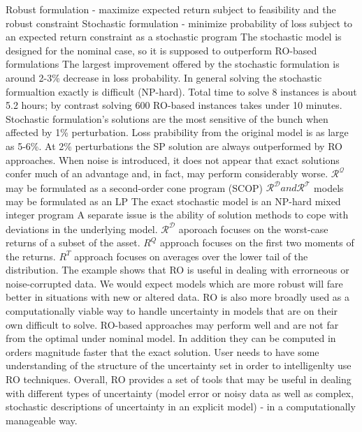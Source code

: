 \documentclass{beamer}
\begin{document}
\begin{frame}{}
Robust formulation - maximize expected return subject to feasibility and the robust constraint
Stochastic formulation - minimize probability of loss subject to an expected return constraint as a stochastic program
The stochastic model is designed for the nominal case, so it is supposed to outperform RO-based formulations
The largest improvement offered by the stochastic formulation is around 2-3\% decrease in loss probability.
In general solving the stochastic formualtion exactly is difficult (NP-hard).
Total time to solve 8 instances is about 5.2 hours; by contrast solving 600 RO-based instances takes under 10 minutes.
Stochastic formulation's solutions are the most sensitive of the bunch when affected by 1\% perturbation. Loss prabibility from the original model is as large as 5-6\%.
At 2\% perturbations the SP solution are always outperformed by RO approaches.
When noise is introduced, it does not appear that exact solutions confer much of an advantage and, in fact, may perform considerably worse.
$\mathcal{R^Q}$ may be formulated as a second-order cone program (SCOP)
$\mathcal{R^D} and \mathcal{R^T}$ models may be formulated as an LP
The exact stochastic model is an NP-hard mixed integer program
A separate issue is the ability of solution methods to cope with deviations in the underlying model. $\mathcal{R^D}$ aporoach focuses on the worst-case returns of a subset of the asset.
$R^Q$ approach focuses on the first two moments of the returns.
$R^T$ approach focuses on averages over the lower tail of the distribution.
The example shows that RO is useful in dealing with errorneous or noise-corrupted data. We would expect models which are more robust will fare better in situations with new or altered data.
RO is also more broadly used as a computationally viable way to handle uncertainty in models that are on their own difficult to solve.
RO-based approaches may perform well and are not far from the optimal under nominal model. In addition they can be computed in orders magnitude faster that the exact solution.
User needs to have some understanding of the structure of the uncertainty set in order to intelligenlty use RO techniques.
Overall, RO provides a set of tools that may be useful in dealing with different types of uncertainty (model error or noisy data as well as complex, stochastic descriptions of uncertainty in an explicit model) - in a computationally manageable way.

\end{frame}
\end{document}
